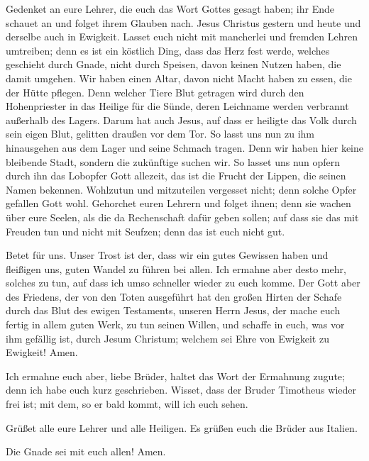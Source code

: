  Gedenket an eure Lehrer, die euch das Wort Gottes gesagt
haben; ihr Ende schauet an und folget ihrem Glauben nach. 
Jesus Christus gestern und heute und derselbe auch in Ewigkeit.
 Lasset euch nicht mit mancherlei und fremden Lehren
umtreiben; denn es ist ein köstlich Ding, dass das Herz fest werde,
welches geschieht durch Gnade, nicht durch Speisen, davon keinen Nutzen
haben, die damit umgehen.  Wir haben einen Altar, davon
nicht Macht haben zu essen, die der Hütte pflegen.  Denn
welcher Tiere Blut getragen wird durch den Hohenpriester in das Heilige
für die Sünde, deren Leichname werden verbrannt außerhalb des Lagers.
 Darum hat auch Jesus, auf dass er heiligte das Volk
durch sein eigen Blut, gelitten draußen vor dem Tor.  So
lasst uns nun zu ihm hinausgehen aus dem Lager und seine Schmach tragen.
 Denn wir haben hier keine bleibende Stadt, sondern die
zukünftige suchen wir.  So lasset uns nun opfern durch
ihn das Lobopfer Gott allezeit, das ist die Frucht der Lippen, die
seinen Namen bekennen.  Wohlzutun und mitzuteilen
vergesset nicht; denn solche Opfer gefallen Gott wohl. 
Gehorchet euren Lehrern und folget ihnen; denn sie wachen über eure
Seelen, als die da Rechenschaft dafür geben sollen; auf dass sie das mit
Freuden tun und nicht mit Seufzen; denn das ist euch nicht gut.

 Betet für uns. Unser Trost ist der, dass wir ein gutes
Gewissen haben und fleißigen uns, guten Wandel zu führen bei allen.
 Ich ermahne aber desto mehr, solches zu tun, auf dass
ich umso schneller wieder zu euch komme.  Der Gott aber
des Friedens, der von den Toten ausgeführt hat den großen Hirten der
Schafe durch das Blut des ewigen Testaments, unseren Herrn Jesus,
 der mache euch fertig in allem guten Werk, zu tun seinen
Willen, und schaffe in euch, was vor ihm gefällig ist, durch Jesum
Christum; welchem sei Ehre von Ewigkeit zu Ewigkeit! Amen.

 Ich ermahne euch aber, liebe Brüder, haltet das Wort der
Ermahnung zugute; denn ich habe euch kurz geschrieben. 
Wisset, dass der Bruder Timotheus wieder frei ist; mit dem, so er bald
kommt, will ich euch sehen.

 Grüßet alle eure Lehrer und alle Heiligen. Es grüßen
euch die Brüder aus Italien.

 Die Gnade sei mit euch allen! Amen.
